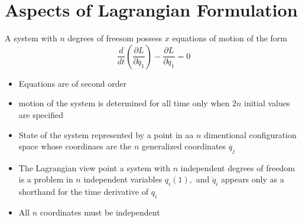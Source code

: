 \section{Aspects of Lagrangian Formulation}
A system with $n$ degrees of freesom possess $x$ equations of motion of the form
$$\frac{d}{dt}\left( \frac{\partial L}{\partial \dot{q}_1}\right)-\frac{\partial L}{\partial q_1}=0 $$
\begin{itemize}
	\item Equations are of second order
	\item motion of the system is determined for all time only when $2n$ initial values are specified
	\item State of the system represented by a point in aa $n$ dimentional configuration space whose coordinaes are the $n$ generalized coordinates $q_j$
	\item The Lagrangian view point a system with $n$ independent degrees of freedom is a problem in $n$ independent variables $q_i(1), $ and  $\dot{q}_i$ appears only as a shorthand for the time derivative of $q_i$
	\item All $n$ coordinates must be independent
\end{itemize}